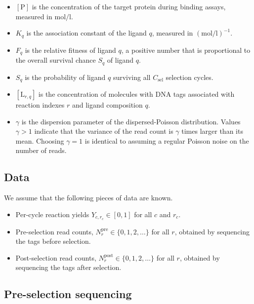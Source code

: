 \documentclass[letter,10pt,oneside]{article}
\newcommand{\+}{^\dagger}
\begin{document}
\begin{itemize}
  \item $[\text{P}]$ is the concentration of the target protein during binding assays, measured in $\text{mol}/\text{l}$.

  \item $K_q$ is the association constant of the ligand $q$, measured in $(\text{mol}/\text{l})^{-1}$.

  \item $F_q$ is the relative fitness of ligand $q$, a positive number that is proportional to the overall survival chance $S_q$ of ligand $q$.

  \item $S_q$ is the probability of ligand $q$ surviving all $C_\text{sel}$ selection cycles.

  \item $[\text{L}_{r, q}]$ is the concentration of molecules with DNA tags associated with reaction indexes $r$ and ligand composition $q$.

  \item $\gamma$ is the dispersion parameter of the dispersed-Poisson distribution. Values $\gamma > 1$ indicate that the variance of the read count is $\gamma$ times larger than its mean. Choosing $\gamma = 1$ is identical to assuming a regular Poisson noise on the number of reads.

\end{itemize}

\subsection{Data}

We assume that the following pieces of data are known.
\begin{itemize}
  \item Per-cycle reaction yields $Y_{c, r_c} \in [0, 1]$ for all $c$ and $r_c$.
  \item Pre-selection read counts, $N^\text{pre}_r \in\{0, 1, 2, \ldots\}$ for all $r$, obtained by sequencing the tags before selection.
  \item Post-selection read counts, $N^\text{post}_r\in\{0, 1, 2, \ldots\}$ for all $r$, obtained by sequencing the tags after selection.
\end{itemize}


\subsection{Pre-selection sequencing}
\end{document}
